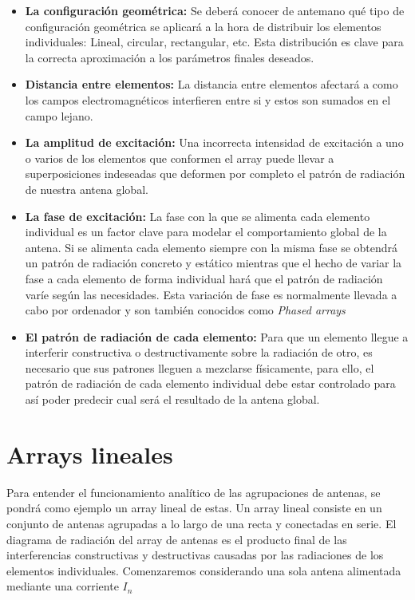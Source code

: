 \begin{itemize}
\item \textbf{La configuración geométrica: }Se deberá conocer de antemano qué tipo de configuración geométrica se aplicará a la hora de distribuir los elementos individuales: Lineal, circular, rectangular, etc. Esta distribución es clave para la correcta aproximación a los parámetros finales deseados.

\item \textbf{Distancia entre elementos: }La distancia entre elementos  afectará a como los campos electromagnéticos interfieren entre si y estos son sumados en el campo lejano.

\item \textbf{La amplitud de excitación: }Una incorrecta intensidad de excitación a uno o varios de los elementos que conformen el array puede llevar a superposiciones indeseadas que deformen por completo el patrón de radiación de nuestra antena global.

\item \textbf{La fase de excitación: }La fase con la que se alimenta cada elemento individual es un factor clave para modelar el comportamiento global de la antena. Si se alimenta cada elemento siempre con la misma fase se obtendrá un patrón de radiación concreto y estático mientras que el hecho de variar la fase a cada elemento de forma individual hará que el patrón de radiación varíe según las necesidades. Esta variación de fase es normalmente llevada a cabo por ordenador y son también conocidos como \textit{Phased arrays}

\item \textbf{El patrón de radiación de cada elemento: }Para que un elemento llegue a interferir constructiva o destructivamente sobre la radiación de otro, es necesario que sus patrones lleguen a mezclarse físicamente, para ello, el patrón de radiación de cada elemento individual debe estar controlado para así poder predecir cual será el resultado de la antena global.
\end{itemize}

\section{Arrays lineales}
\par Para entender el funcionamiento analítico de las agrupaciones de antenas, se pondrá como ejemplo un array lineal de estas. Un array lineal consiste en un conjunto de antenas agrupadas a lo largo de una recta y conectadas en serie. El diagrama de radiación del array de antenas es el producto final de las interferencias constructivas y destructivas causadas por las radiaciones de los elementos individuales. Comenzaremos considerando una sola antena alimentada mediante una corriente $I_{n}$


